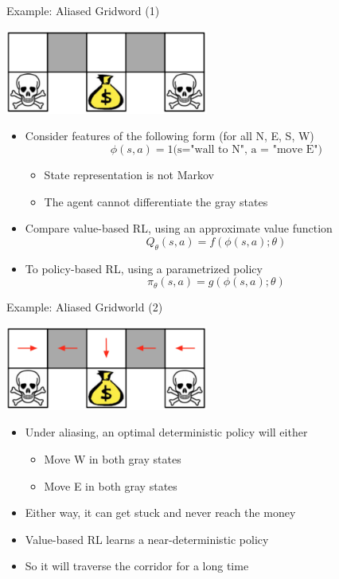 \documentclass[aspectratio=169]{../latex_main/tntbeamer}  %
\begin{document}
\begin{frame}[c]{Example: Aliased Gridword (1)}
	
	\begin{center}
		\includegraphics[width=0.5\textwidth]{images/gridworld1.png}
	\end{center}
	
	\begin{itemize}
		\item Consider features of the following form (for all N, E, S, W)
		$$\phi(s,a) = 1\text{(s="wall to N", a = "move E")}$$
		\vspace{-1em}
		\begin{itemize}
			\item State representation is not Markov
			\item The agent \alert{cannot} differentiate the gray states
		\end{itemize}
		\item Compare value-based RL, using an approximate value function
		$$Q_\theta (s,a) = f(\phi(s,a); \theta)$$
		\item To policy-based RL, using a parametrized policy
		$$\pi_\theta(s,a) = g(\phi(s,a); \theta) $$ 
	\end{itemize}
	
\end{frame}
\begin{frame}[c]{Example: Aliased Gridworld (2)}
	
	\begin{center}
		\includegraphics[width=0.5\textwidth]{images/gridworld2.png}
	\end{center}
	
	\begin{itemize}
		\item Under aliasing, an optimal \alert{deterministic} policy will either
		\begin{itemize}
			\item Move W in both gray states 
			\item Move E in both gray states
		\end{itemize}
		\item Either way, it can get stuck and never reach the money
		\item Value-based RL learns a near-deterministic policy
		\item So it will traverse the corridor for a long time
	\end{itemize}

\end{frame}
\end{document}
